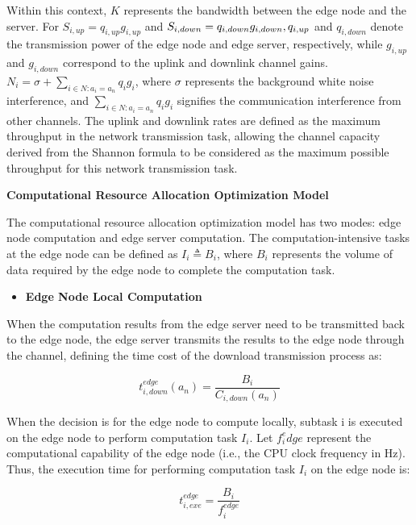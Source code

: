 \documentclass[preprint,12pt]{elsarticle}
\begin{document}
Within this context, \(K\) represents the bandwidth between the edge node and the server. For \(S_{i, up}=q_{i, up}g_{i, up}\) and \( S_{i, down}=q_{i, down} g_{i, down}, q_{i\\, up}\) and \(q_{i, down}\)  denote the transmission power of the edge node and edge server, respectively, while \(g_{i, up}\) and \(g_{i, down}\) correspond to the uplink and downlink channel gains. \(N_i=\sigma+\sum_{i\in{N}:a_i=a_n}q_i g_i\), where  \(\sigma\) represents the background white noise interference, and  \(\sum_{i\in{N}:a_i=a_n}q_i g_i\) signifies the communication interference from other channels. The uplink and downlink rates are defined as the maximum throughput in the network transmission task, allowing the channel capacity derived from the Shannon formula to be considered as the maximum possible throughput for this network transmission task.

\textbf{Computational Resource Allocation Optimization Model}

The computational resource allocation optimization model has two modes: edge node computation and edge server computation. The computation-intensive tasks at the edge node can be defined as \(I_i \triangleq B_i\), where \(B_i\) represents the volume of data required by the edge node to complete the computation task.

\begin{itemize}
    \item {\fontsize{11}{\baselineskip}\selectfont \textbf{Edge Node Local Computation}}
\end{itemize}

When the computation results from the edge server need to be transmitted back to the edge node, the edge server transmits the results to the edge node through the channel, defining the time cost of the download transmission process as:

\begin{equation}
    t_{i,down}^{edge} (a_n )=\frac{B_i}{C_{i,down} (a_n )} 
\end{equation}


When the decision is for the edge node to compute locally, subtask i is executed on the edge node to perform computation task \(I_i\). Let \(f_i^edge\) represent the computational capability of the edge node (i.e., the CPU clock frequency in Hz). Thus, the execution time for performing computation task \(I_i\) on the edge node is:

\begin{equation}
    t_{i,exe}^{edge}=\frac{B_i}{f_i^{edge}}
\end{equation}
\end{document}
